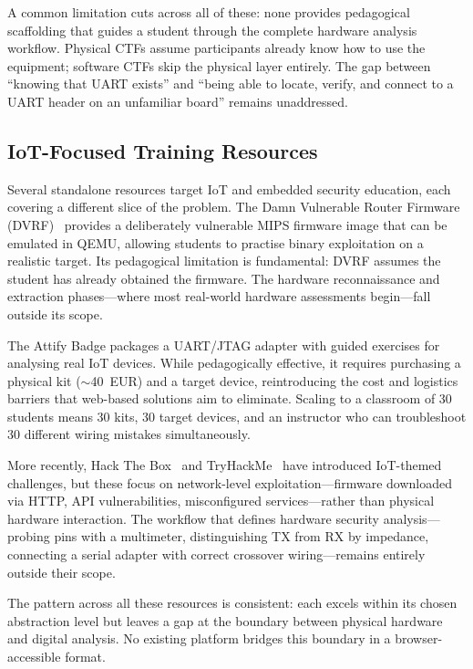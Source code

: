 A common limitation cuts across all of these: none provides pedagogical scaffolding that guides a student through the complete hardware analysis workflow. Physical CTFs assume participants already know how to use the equipment; software CTFs skip the physical layer entirely. The gap between ``knowing that UART exists'' and ``being able to locate, verify, and connect to a UART header on an unfamiliar board'' remains unaddressed.

\subsection{IoT-Focused Training Resources}\label{subsec:iot-training}

Several standalone resources target IoT and embedded security education, each covering a different slice of the problem. The Damn Vulnerable Router Firmware (DVRF)~\cite{iotgoat} provides a deliberately vulnerable MIPS firmware image that can be emulated in QEMU, allowing students to practise binary exploitation on a realistic target. Its pedagogical limitation is fundamental: DVRF assumes the student has already obtained the firmware. The hardware reconnaissance and extraction phases---where most real-world hardware assessments begin---fall outside its scope.

The Attify Badge packages a UART/JTAG adapter with guided exercises for analysing real IoT devices. While pedagogically effective, it requires purchasing a physical kit ($\sim$40~EUR) and a target device, reintroducing the cost and logistics barriers that web-based solutions aim to eliminate. Scaling to a classroom of 30 students means 30 kits, 30 target devices, and an instructor who can troubleshoot 30 different wiring mistakes simultaneously.

More recently, Hack The Box~\cite{hackthebox} and TryHackMe~\cite{tryhackme} have introduced IoT-themed challenges, but these focus on network-level exploitation---firmware downloaded via HTTP, API vulnerabilities, misconfigured services---rather than physical hardware interaction. The workflow that defines hardware security analysis---probing pins with a multimeter, distinguishing TX from RX by impedance, connecting a serial adapter with correct crossover wiring---remains entirely outside their scope.

The pattern across all these resources is consistent: each excels within its chosen abstraction level but leaves a gap at the boundary between physical hardware and digital analysis. No existing platform bridges this boundary in a browser-accessible format.

